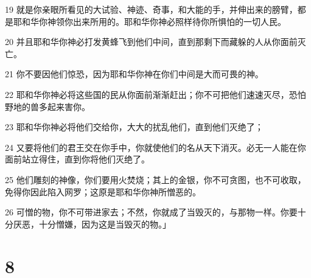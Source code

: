 \par 19 就是你亲眼所看见的大试验、神迹、奇事，和大能的手，并伸出来的膀臂，都是耶和华你神领你出来所用的。耶和华你神必照样待你所惧怕的一切人民。
\par 20 并且耶和华你神必打发黄蜂飞到他们中间，直到那剩下而藏躲的人从你面前灭亡。
\par 21 你不要因他们惊恐，因为耶和华你神在你们中间是大而可畏的神。
\par 22 耶和华你神必将这些国的民从你面前渐渐赶出；你不可把他们速速灭尽，恐怕野地的兽多起来害你。
\par 23 耶和华你神必将他们交给你，大大的扰乱他们，直到他们灭绝了；
\par 24 又要将他们的君王交在你手中，你就使他们的名从天下消灭。必无一人能在你面前站立得住，直到你将他们灭绝了。
\par 25 他们雕刻的神像，你们要用火焚烧；其上的金银，你不可贪图，也不可收取，免得你因此陷入网罗；这原是耶和华你神所憎恶的。
\par 26 可憎的物，你不可带进家去；不然，你就成了当毁灭的，与那物一样。你要十分厌恶，十分憎嫌，因为这是当毁灭的物。」

\chapter{8}

